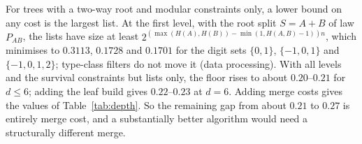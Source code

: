 For trees with a two-way root and modular constraints only, a lower bound on any
cost is the largest list. At the first level, with the root split $S=A+B$ of law $P_{AB}$, the lists have size at least
$2^{(\max(H(A),H(B))-\min(1,H(A,B)-1))n}$, which minimises to $0.3113$, $0.1728$ and $0.1701$ for the digit sets
$\{0,1\}$, $\{-1,0,1\}$ and $\{-1,0,1,2\}$; type-class filters do not move it (data processing). With all levels and
the survival constraints but lists only, the floor rises to about $0.20$--$0.21$ for $d\le6$; adding the leaf build
gives $0.22$--$0.23$ at $d=6$. Adding merge costs gives the values of Table~\ref{tab:depth}. So the remaining gap from
about $0.21$ to $0.27$ is entirely merge cost, and a substantially better algorithm would need a structurally
different merge. 
